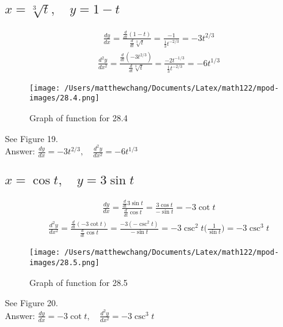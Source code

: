 \documentclass{article}
\begin{document}
\subsection{$x = \sqrt[3]{t}, \quad y = 1 - t$}
\begin{align*}
	\frac{dy}{dx} = \frac{\frac{d}{dt}(1 - t)}{\frac{d}{dt}\sqrt[3]{t}} = \frac{-1}{\frac{1}{3}t^{-2/3}} = -3t^{2/3}
\end{align*}
\begin{align*}
	\frac{d^2 y}{dx^2} = \frac{\frac{d}{dt} \left( -3t^{2/3} \right)}{\frac{d}{dt}\sqrt[3]{t}} = \frac{-2t^{-1/3}}{\frac{1}{3}t^{-2/3}} = -6t^{1/3}
\end{align*}
\begin{figure}
	\centering
	\texttt{[image: /Users/matthewchang/Documents/Latex/math122/mpod-images/28.4.png]}
	\caption{Graph of function for 28.4}
\end{figure}
See Figure 19. \\[10pt]
Answer: $\frac{dy}{dx} = -3t^{2/3}, \quad \frac{d^2 y}{dx^2} = -6t^{1/3}$

\subsection{$x = \cos{t}, \quad y = 3\sin{t}$}
\begin{align*}
	\frac{dy}{dx} = \frac{\frac{d}{dt}3\sin{t}}{\frac{d}{dt}\cos{t}} = \frac{3\cos{t}}{-\sin{t}} = -3\cot{t}
\end{align*}
\begin{align*}
	\frac{d^2 y}{dx^2} = \frac{\frac{d}{dt} (-3\cot{t})}{\frac{d}{dt} \cos{t}} = \frac{-3(-\csc^2{t})}{-\sin{t}} = -3 \csc^2{t} \bigg( \frac{1}{\sin{t}} \bigg) = -3 \csc^3{t}
\end{align*}

\begin{figure}
	\centering
	\texttt{[image: /Users/matthewchang/Documents/Latex/math122/mpod-images/28.5.png]}
	\caption{Graph of function for 28.5}
\end{figure}
See Figure 20. \\[10pt]
Answer: $\frac{dy}{dx} = -3\cot{t}, \quad \frac{d^2 y}{dx^2} = -3\csc^3{t}$

\end{document}
